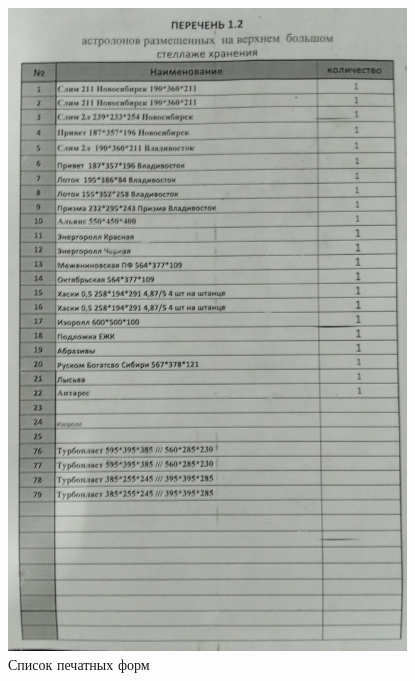 \begin{figure}
\begin{center}
  \includegraphics[height=0.94\textheight, width=0.94\textwidth, keepaspectratio]{Pics 1/6 перечень оснастки.jpg}
\end{center}
  \caption{Список печатных форм}
  \label{pic:1/6 перечень оснастки}
\end{figure}

